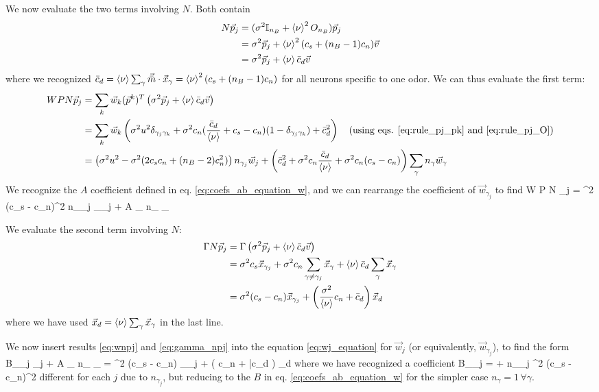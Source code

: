 We now evaluate the two terms involving $N$. Both contain
\begin{align*}
	N \vec{p}_j &= (\sigma^2 \mathbb{I}_{n_B} + \braket{\nu}^2 O_{n_B}) \vec{p}_j \\
		&= \sigma^2 \vec{p}_j + \braket{\nu}^2 (c_s + (n_B - 1) c_n) \vec{v}	\\
		&= \sigma^2 \vec{p}_j + \braket{\nu} \bar{c}_d \vec{v}
\end{align*}
where we recognized $\bar{c}_d = \braket{\nu} \sum_{\gamma} \vec{\bar{m}} \cdot \vec{x}_{\gamma} = \braket{\nu}^2 (c_s + (n_B - 1) c_n)$ for all neurons specific to one odor. We can thus evaluate the first term:
\begin{align*}
	W P N \vec{p}_j &= \sum_k \vec{w}_k (\vec{p}^k)^T \left(\sigma^2 \vec{p}_j + \braket{\nu} \bar{c}_d \vec{v} \right)	\\
		&= \sum_k \vec{w}_k \left(\sigma^2 u^2 \delta_{\gamma_j \gamma_k} + \sigma^2 c_n (\frac{\bar{c}_d}{\braket{\nu}} + c_s - c_n) (1 - \delta_{\gamma_j \gamma_k}) + \bar{c}_d^2  \right) 	\quad \text{(using eqs. \ref{eq:rule_pj_pk} and \ref{eq:rule_pj_O})}	\\
		&= \left( \sigma^2 u^2 - \sigma^2 (2 c_s c_n + (n_B - 2) c_n^2) \right) n_{\gamma_j} \vec{w}_j  +  \left(\bar{c}_d^2 + \sigma^2 c_n \frac{\bar{c}_d}{\braket{\nu}} + \sigma^2 c_n(c_s - c_n) \right) \sum_{\gamma} n_{\gamma} \vec{w}_{\gamma} 
\end{align*}
We recognize the $A$ coefficient defined in eq. \eqref{eq:coefs_ab_equation_w}, and we can rearrange the coefficient of $\vec{w}_{\gamma_j}$ to find
\beq
	W P N _j = \sigma^2 (c_s - c_n)^2 n_{\gamma_j} _{\gamma_j} + A \sum_{\gamma} n_{\gamma} _{\gamma}
	\label{eq:wnpj}
\eeq

We evaluate the second term involving $N$:
\begin{align}
	\Gamma N \vec{p}_j &= \Gamma \left(\sigma^2 \vec{p}_j + \braket{\nu} \bar{c}_d \vec{v} \right)	\\
		&= \sigma^2 c_s \vec{x}_{\gamma_j} + \sigma^2 c_n \sum_{\gamma \neq \gamma_j} \vec{x}_{\gamma} + \braket{\nu} \bar{c}_d \sum_{\gamma} \vec{x}_{\gamma}	\\
		&= \sigma^2 (c_s - c_n) \vec{x}_{\gamma_j} + \left(\frac{\sigma^2}{\braket{\nu}} c_n +  \bar{c}_d \right) \vec{x}_d \label{eq:gamma_npj}
\end{align}
where we have used $\vec{x}_d = \braket{\nu} \sum_{\gamma} \vec{x}_{\gamma}$ in the last line. 

We now insert results \eqref{eq:wnpj} and \eqref{eq:gamma_npj} into the equation \eqref{eq:wj_equation} for $\vec{w}_j$ (or equivalently, $\vec{w}_{\gamma_j}$), to find the form
\beq
	B_{\gamma_j} _j + A \sum_{\gamma} n_{\gamma} _{\gamma} = \sigma^2 (c_s - c_n) _{\gamma_j} + \left( c_n +  \bar{c}_d \right) _d 
	\label{eq:bj_wj_equation}
\eeq
where we have recognized a coefficient
\beq
	B_{\gamma_j} = \frac{\beta}{\alpha} + n_{\gamma_j} \sigma^2 (c_s - c_n)^2
	\label{eq:bj_def}
\eeq 
different for each $j$ due to $n_{\gamma_j}$, but reducing to the $B$ in eq. \eqref{eq:coefs_ab_equation_w} for the simpler case $n_{\gamma} = 1 \, \forall \gamma$.  

